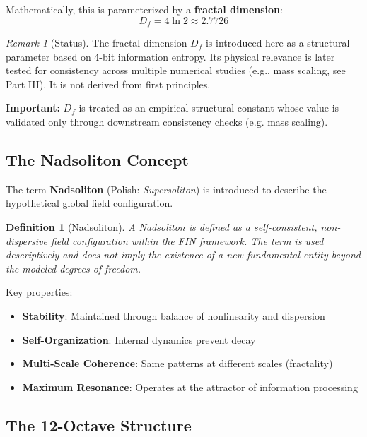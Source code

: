 \documentclass[11pt,a4paper]{book}
\newtheorem{definition}{Definition}[section]
\theoremstyle{remark}
\newtheorem{remark}{Remark}[section]
\begin{document}
Mathematically, this is parameterized by a \textbf{fractal dimension}:
\begin{equation}
D_f = 4 \ln 2 \approx 2.7726
\label{eq:fractal_dimension}
\end{equation}

\begin{remark}[Status]
The fractal dimension $D_f$ is introduced here as a structural parameter based on 4-bit information entropy. Its physical relevance is later tested for consistency across multiple numerical studies (e.g., mass scaling, see Part III). It is not derived from first principles.

\textbf{Important:} $D_f$ is treated as an empirical structural constant whose value is validated only through downstream consistency checks (e.g. mass scaling).
\end{remark}

\subsection{The Nadsoliton Concept}

The term \textbf{Nadsoliton} (Polish: \textit{Supersoliton}) is introduced to describe the hypothetical global field configuration.

\begin{definition}[Nadsoliton]
A Nadsoliton is defined as a self-consistent, non-dispersive field configuration within the FIN framework. The term is used descriptively and does not imply the existence of a new fundamental entity beyond the modeled degrees of freedom.
\end{definition}

Key properties:
\begin{itemize}
    \item \textbf{Stability}: Maintained through balance of nonlinearity and dispersion
    \item \textbf{Self-Organization}: Internal dynamics prevent decay
    \item \textbf{Multi-Scale Coherence}: Same patterns at different scales (fractality)
    \item \textbf{Maximum Resonance}: Operates at the attractor of information processing
\end{itemize}

\subsection{The 12-Octave Structure}
\end{document}

